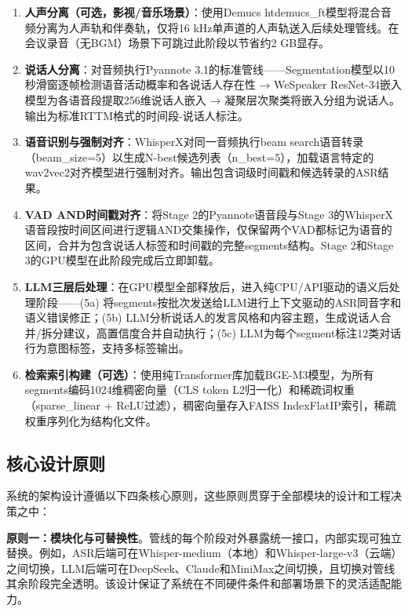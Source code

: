 \documentclass[12pt, a4paper]{article}
\begin{document}
\begin{enumerate}[label=Stage \arabic*:, leftmargin=*]
    \item \textbf{人声分离（可选，影视/音乐场景）}：使用Demucs htdemucs\_ft模型将混合音频分离为人声轨和伴奏轨，仅将16 kHz单声道的人声轨送入后续处理管线。在会议录音（无BGM）场景下可跳过此阶段以节省约2 GB显存。
    \item \textbf{说话人分离}：对音频执行Pyannote 3.1的标准管线——Segmentation模型以10秒滑窗逐帧检测语音活动概率和各说话人存在性 → WeSpeaker ResNet-34嵌入模型为各语音段提取256维说话人嵌入 → 凝聚层次聚类将嵌入分组为说话人。输出为标准RTTM格式的时间段-说话人标注。
    \item \textbf{语音识别与强制对齐}：WhisperX对同一音频执行beam search语音转录（beam\_size=5）以生成N-best候选列表（n\_best=5），加载语言特定的wav2vec2对齐模型进行强制对齐。输出包含词级时间戳和候选转录的ASR结果。
    \item \textbf{VAD AND时间戳对齐}：将Stage 2的Pyannote语音段与Stage 3的WhisperX语音段按时间区间进行逻辑AND交集操作，仅保留两个VAD都标记为语音的区间，合并为包含说话人标签和时间戳的完整segments结构。Stage 2和Stage 3的GPU模型在此阶段完成后立即卸载。
    \item \textbf{LLM三层后处理}：在GPU模型全部释放后，进入纯CPU/API驱动的语义后处理阶段——(5a) 将segments按批次发送给LLM进行上下文驱动的ASR同音字和语义错误修正；(5b) LLM分析说话人的发言风格和内容主题，生成说话人合并/拆分建议，高置信度合并自动执行；(5c) LLM为每个segment标注12类对话行为意图标签，支持多标签输出。
    \item \textbf{检索索引构建（可选）}：使用纯Transformer库加载BGE-M3模型，为所有segments编码1024维稠密向量（CLS token L2归一化）和稀疏词权重（sparse\_linear + ReLU过滤），稠密向量存入FAISS IndexFlatIP索引，稀疏权重序列化为结构化文件。
\end{enumerate}

\subsection{核心设计原则}

系统的架构设计遵循以下四条核心原则，这些原则贯穿于全部模块的设计和工程决策之中：

\textbf{原则一：模块化与可替换性}。管线的每个阶段对外暴露统一接口，内部实现可独立替换。例如，ASR后端可在Whisper-medium（本地）和Whisper-large-v3（云端）之间切换，LLM后端可在DeepSeek、Claude和MiniMax之间切换，且切换对管线其余阶段完全透明。该设计保证了系统在不同硬件条件和部署场景下的灵活适配能力。
\end{document}
